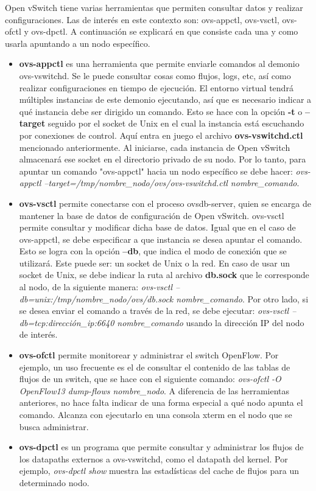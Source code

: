 Open vSwitch tiene varias herramientas que permiten consultar datos y realizar configuraciones. Las de interés en este contexto son: ovs-appctl, ovs-vsctl, ovs-ofctl y ovs-dpctl. A continuación se explicará en que consiste cada una y como usarla apuntando a un nodo específico.
\begin{itemize}
	\item \textbf{ovs-appctl} \cite{ovs-appctl} es una herramienta que permite enviarle comandos al demonio ovs-vswitchd. Se le puede consultar cosas como flujos, logs, etc, así como realizar configuraciones en tiempo de ejecución. El entorno virtual tendrá múltiples instancias de este demonio ejecutando, así que es necesario indicar a qué instancia debe ser dirigido un comando. Esto se hace con la opción \textbf{-t} o \textbf{--target} seguido por el socket de Unix en el cual la instancia está escuchando por conexiones de control. Aquí entra en juego el archivo \textbf{ovs-vswitchd.ctl} mencionado anteriormente. Al iniciarse, cada instancia de Open vSwitch almacenará ese socket en el directorio privado de su nodo. Por lo tanto, para apuntar un comando "ovs-appctl" hacia un nodo específico se debe hacer: \textit{ovs-appctl --target=/tmp/nombre\_nodo/ovs/ovs-vswitchd.ctl nombre\_comando}.
	\item \textbf{ovs-vsctl} \cite{ovs-vsctl} permite conectarse con el proceso ovsdb-server, quien se encarga de mantener la base de datos de configuración de Open vSwitch. ovs-vsctl permite consultar y modificar dicha base de datos. Igual que en el caso de ovs-appctl, se debe especificar a que instancia se desea apuntar el comando. Esto se logra con la opción \textbf{--db}, que indica el modo de conexión que se utilizará. Este puede ser: un socket de Unix o la red. En caso de usar un socket de Unix, se debe indicar la ruta al archivo \textbf{db.sock} que le corresponde al nodo, de la siguiente manera: \textit{ovs-vsctl --db=unix:/tmp/nombre\_nodo/ovs/db.sock nombre\_comando}. Por otro lado, si se desea enviar el comando a través de la red, se debe ejecutar: \textit{ovs-vsctl --db=tcp:dirección\_ip:6640 nombre\_comando} usando la dirección IP del nodo de interés.
	\item \textbf{ovs-ofctl} \cite{ovs-ofctl} permite monitorear y administrar el switch OpenFlow. Por ejemplo, un uso frecuente es el de consultar el contenido de las tablas de flujos de un switch, que se hace con el siguiente comando: \textit{ovs-ofctl -O OpenFlow13 dump-flows nombre\_nodo}. A diferencia de las herramientas anteriores, no hace falta indicar de una forma especial a qué nodo apunta el comando. Alcanza con ejecutarlo en una consola xterm en el nodo que se busca administrar.
	\item \textbf{ovs-dpctl} \cite{ovs-dpctl} es un programa que permite consultar y administrar los flujos de los datapaths externos a ovs-vswitchd, como el datapath del kernel. Por ejemplo, \textit{ovs-dpctl show} muestra las estadísticas del cache de flujos para un determinado nodo.
\end{itemize}

